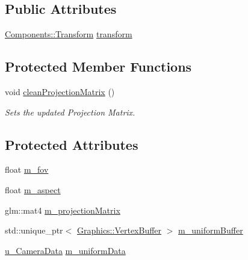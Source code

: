 \subsection*{Public Attributes}
\begin{DoxyCompactItemize}
\item 
\hyperlink{class_cookie_eng_1_1_components_1_1_transform}{Components\+::\+Transform} \hyperlink{class_cookie_eng_1_1_object_1_1_camera_aa996e685c79a71bd30e88341b68ed197}{transform}
\end{DoxyCompactItemize}
\subsection*{Protected Member Functions}
\begin{DoxyCompactItemize}
\item 
void \hyperlink{class_cookie_eng_1_1_object_1_1_camera_ab685b627f1a3bc019ae68185d41ee38b}{clean\+Projection\+Matrix} ()
\begin{DoxyCompactList}\small\item\em Sets the updated Projection Matrix. \end{DoxyCompactList}\end{DoxyCompactItemize}
\subsection*{Protected Attributes}
\begin{DoxyCompactItemize}
\item 
float \hyperlink{class_cookie_eng_1_1_object_1_1_camera_a8ec41f98d646a5c9dd733157ee41f435}{m\+\_\+fov}
\item 
float \hyperlink{class_cookie_eng_1_1_object_1_1_camera_a86c6f04a4f39bfa931493b1f6b9c013c}{m\+\_\+aspect}
\item 
glm\+::mat4 \hyperlink{class_cookie_eng_1_1_object_1_1_camera_a6a5152fd8fbd92c4cbcc73d14511e584}{m\+\_\+projection\+Matrix}
\item 
std\+::unique\+\_\+ptr$<$ \hyperlink{class_cookie_eng_1_1_graphics_1_1_vertex_buffer}{Graphics\+::\+Vertex\+Buffer} $>$ \hyperlink{class_cookie_eng_1_1_object_1_1_camera_a609beae2a3fb5cfca418fac357ef6d36}{m\+\_\+uniform\+Buffer}
\item 
\hyperlink{struct_cookie_eng_1_1_object_1_1u___camera_data}{u\+\_\+\+Camera\+Data} \hyperlink{class_cookie_eng_1_1_object_1_1_camera_acd3f4dab5ebb7b14b6e5ffd9704bccb6}{m\+\_\+uniform\+Data}
\end{DoxyCompactItemize}



